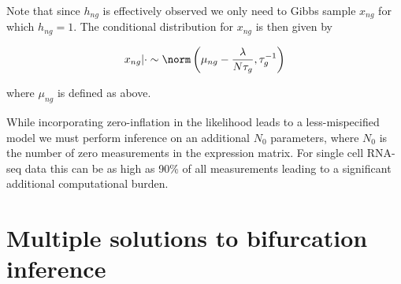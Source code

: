 Note that since $h_{ng}$ is effectively observed we only need to Gibbs sample $x_{ng}$ for which $h_{ng} = 1$. The conditional distribution for $x_{ng}$ is then given by

\begin{equation}
x_{ng} | \cdot \sim \norm\left( \mu_{ng} - \frac{\lambda}{N \tau_g}, \tau_g^{-1} \right)
\end{equation}

where $\mu_{ng}$ is defined as above.




While incorporating zero-inflation in the likelihood leads to a less-mispecified model we must perform inference on an additional $N_0$ parameters, where $N_0$ is the number of zero measurements in the expression matrix. For single cell RNA-seq data this can be as high as 90\% of all measurements leading to a significant additional computational burden.



\section{Multiple solutions to bifurcation inference}

